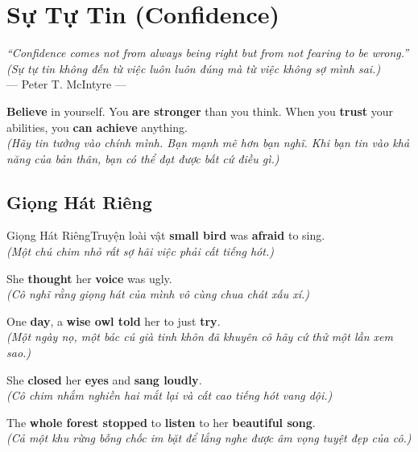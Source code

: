 \chapter{Sự Tự Tin (Confidence)}

\begin{center}
  \textit{\color{truyenblue}``Confidence comes not from always being right but from not fearing to be wrong.''}\\
  \textit{(Sự tự tin không đến từ việc luôn luôn đúng mà từ việc không sợ mình sai.)}\\[4pt]
  \small\color{truyengold}--- Peter T. McIntyre ---
\end{center}

\ngancach

\begin{tcolorbox}[
  colback=truyenred!5, colframe=truyenred!40, arc=6pt,
  title={\bfseries Tiếng Nói Bên Trong (The Inner Voice)},
  fonttitle=\bfseries\color{truyenred}
]
  \textbf{Believe} in yourself. You \textbf{are stronger} than you think. When you \textbf{trust} your abilities, you \textbf{can achieve} anything.
  \\ \textit{(Hãy tin tưởng vào chính mình. Bạn mạnh mẽ hơn bạn nghĩ. Khi bạn tin vào khả năng của bản thân, bạn có thể đạt được bất cứ điều gì.)}
\end{tcolorbox}

\vspace{0.6cm}


\ngayDay{}
\section{Giọng Hát Riêng}
\begin{truyen}{Giọng Hát Riêng}{Truyện loài vật}
 \textbf{small bird} was \textbf{afraid} to sing.\\
\textit{(Một chú chim nhỏ rất sợ hãi việc phải cất tiếng hót.)}

She \textbf{thought} her \textbf{voice} was ugly.\\
\textit{(Cô nghĩ rằng giọng hát của mình vô cùng chua chát xấu xí.)}

One \textbf{day}, a \textbf{wise owl told} her to just \textbf{try}.\\
\textit{(Một ngày nọ, một bác cú già tinh khôn đã khuyên cô hãy cứ thử một lần xem sao.)}

She \textbf{closed} her \textbf{eyes} and \textbf{sang loudly}.\\
\textit{(Cô chim nhắm nghiền hai mắt lại và cất cao tiếng hót vang dội.)}

The \textbf{whole forest stopped} to \textbf{listen} to her \textbf{beautiful song}.\\
\textit{(Cả một khu rừng bỗng chốc im bặt để lắng nghe được âm vọng tuyệt đẹp của cô.)}
\end{truyen}

